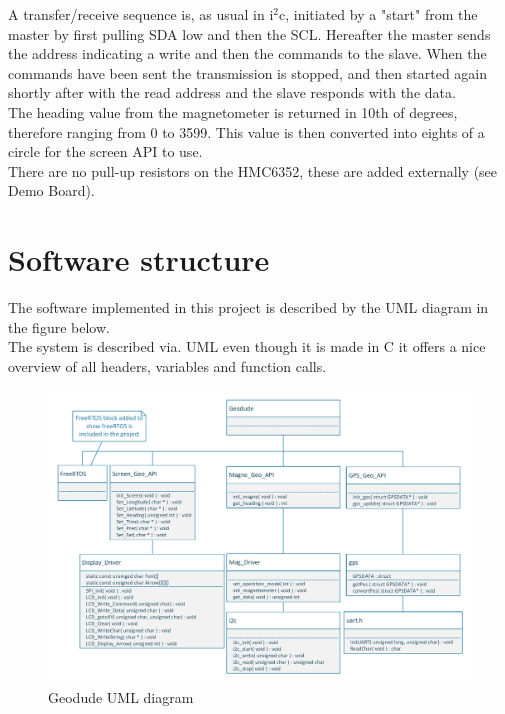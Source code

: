 A transfer/receive sequence is, as usual in i$^2$c, initiated by a "start" from the master by first pulling SDA low and then the SCL. Hereafter the master sends the address indicating a write and then the commands to the slave. When the commands have been sent the transmission is stopped, and then started again shortly after with the read address and the slave responds with the data.\\
The heading value from the magnetometer is returned in 10th of degrees, therefore ranging from 0 to 3599. This value is then converted into eights of a circle for the screen API to use.\\
There are no pull-up resistors on the HMC6352, these are added externally (see Demo Board).\\

\section{Software structure}
The software implemented in this project is described by the UML diagram in the figure below.\\
The system is described via. UML even though it is made in C it offers a nice overview of all headers, variables and function calls.\\

\begin{figure}[H]
\centering
\includegraphics[width=1\textwidth]{billeder/geodude_UML}
\caption{Geodude UML diagram}
\end{figure}

